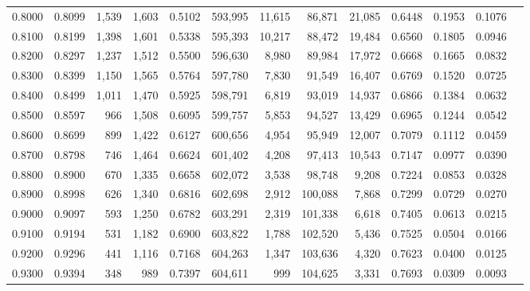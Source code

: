 \begin{tabular}{rrrrrrrrrrrrr}
0.8000 & 0.8099 &  1,539 & 1,603 &                                     0.5102 & 593,995 &  11,615 &  86,871 &  21,085 & 0.6448 & 0.1953 & 0.1076 \\
0.8100 & 0.8199 &  1,398 & 1,601 &                                     0.5338 & 595,393 &  10,217 &  88,472 &  19,484 & 0.6560 & 0.1805 & 0.0946 \\
0.8200 & 0.8297 &  1,237 & 1,512 &                                     0.5500 & 596,630 &   8,980 &  89,984 &  17,972 & 0.6668 & 0.1665 & 0.0832 \\
0.8300 & 0.8399 &  1,150 & 1,565 &                                     0.5764 & 597,780 &   7,830 &  91,549 &  16,407 & 0.6769 & 0.1520 & 0.0725 \\
0.8400 & 0.8499 &  1,011 & 1,470 &                                     0.5925 & 598,791 &   6,819 &  93,019 &  14,937 & 0.6866 & 0.1384 & 0.0632 \\
0.8500 & 0.8597 &    966 & 1,508 &                                     0.6095 & 599,757 &   5,853 &  94,527 &  13,429 & 0.6965 & 0.1244 & 0.0542 \\
0.8600 & 0.8699 &    899 & 1,422 &                                     0.6127 & 600,656 &   4,954 &  95,949 &  12,007 & 0.7079 & 0.1112 & 0.0459 \\
0.8700 & 0.8798 &    746 & 1,464 &                                     0.6624 & 601,402 &   4,208 &  97,413 &  10,543 & 0.7147 & 0.0977 & 0.0390 \\
0.8800 & 0.8900 &    670 & 1,335 &                                     0.6658 & 602,072 &   3,538 &  98,748 &   9,208 & 0.7224 & 0.0853 & 0.0328 \\
0.8900 & 0.8998 &    626 & 1,340 &                                     0.6816 & 602,698 &   2,912 & 100,088 &   7,868 & 0.7299 & 0.0729 & 0.0270 \\
0.9000 & 0.9097 &    593 & 1,250 &                                     0.6782 & 603,291 &   2,319 & 101,338 &   6,618 & 0.7405 & 0.0613 & 0.0215 \\
0.9100 & 0.9194 &    531 & 1,182 &                                     0.6900 & 603,822 &   1,788 & 102,520 &   5,436 & 0.7525 & 0.0504 & 0.0166 \\
0.9200 & 0.9296 &    441 & 1,116 &                                     0.7168 & 604,263 &   1,347 & 103,636 &   4,320 & 0.7623 & 0.0400 & 0.0125 \\
0.9300 & 0.9394 &    348 &   989 &                                     0.7397 & 604,611 &     999 & 104,625 &   3,331 & 0.7693 & 0.0309 & 0.0093 \\

\end{tabular}
